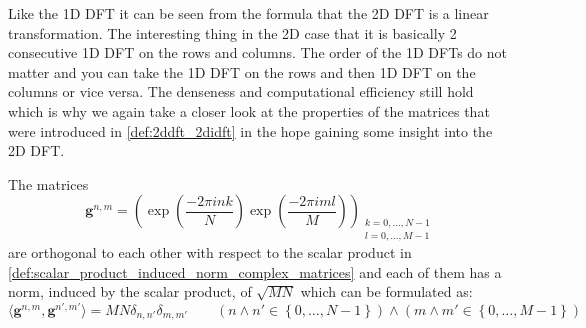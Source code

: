 \begin{Rem}
Like the 1D \ac{DFT} it can be seen from the formula that the 2D \ac{DFT} is a linear transformation. 
The interesting thing in the 2D case that it is basically 2 consecutive 1D \ac{DFT} on the rows and columns. 
The order of the 1D \ac{DFT}s do not matter and you can take the 1D \ac{DFT} on the rows and then 1D 
\ac{DFT} on the columns or vice versa. The denseness and computational efficiency still hold which is why 
we again take a closer look at the properties of the matrices that were introduced in \cref{def:2ddft_2didft} in the hope gaining
some insight into the 2D {DFT}.
\end{Rem}

\begin{Prop}\label{prop:2ddft_matrices_orthogonality}
    The matrices
    \begin{equation}\label{eq:2ddft_matrices}
        \boldsymbol{g}^{n,m} = \left(\exp\left({\frac{-2\pi ink}{N}}\right)\exp\left({\frac{-2\pi iml}{M}}\right)\right)_{\substack{k=0,\ldots,N-1\\l=0,\ldots,M-1}}
    \end{equation}
    are orthogonal to each other with respect to the scalar product in \cref{def:scalar_product_induced_norm_complex_matrices} and 
    each of them has a norm, induced by the scalar product, of $\sqrt{MN}$ which can be formulated as:
    \begin{equation}
        \langle\boldsymbol{g}^{n,m},\boldsymbol{g}^{n',m'}\rangle= MN \delta_{n,n'}\delta_{m,m'} \qquad (n \land n' \in \left\{0,\ldots,N-1\right\}) \land (m \land m' \in \left\{0,\ldots,M-1\right\})
    \end{equation}
\end{Prop}

